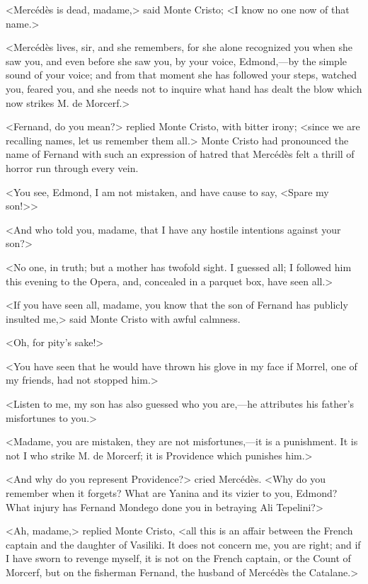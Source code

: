  <Mercédès is dead, madame,> said Monte Cristo; <I know no one now of that name.> 

 <Mercédès lives, sir, and she remembers, for she alone recognized you when she saw you, and even before she saw you, by your voice, Edmond,—by the simple sound of your voice; and from that moment she has followed your steps, watched you, feared you, and she needs not to inquire what hand has dealt the blow which now strikes M. de Morcerf.> 

 <Fernand, do you mean?> replied Monte Cristo, with bitter irony; <since we are recalling names, let us remember them all.> Monte Cristo had pronounced the name of Fernand with such an expression of hatred that Mercédès felt a thrill of horror run through every vein. 

 <You see, Edmond, I am not mistaken, and have cause to say, <Spare my son!>> 

 <And who told you, madame, that I have any hostile intentions against your son?> 

 <No one, in truth; but a mother has twofold sight. I guessed all; I followed him this evening to the Opera, and, concealed in a parquet box, have seen all.> 

 <If you have seen all, madame, you know that the son of Fernand has publicly insulted me,> said Monte Cristo with awful calmness. 

 <Oh, for pity's sake!> 

 <You have seen that he would have thrown his glove in my face if Morrel, one of my friends, had not stopped him.> 

 <Listen to me, my son has also guessed who you are,—he attributes his father's misfortunes to you.> 

 <Madame, you are mistaken, they are not misfortunes,—it is a punishment. It is not I who strike M. de Morcerf; it is Providence which punishes him.> 

 <And why do you represent Providence?> cried Mercédès. <Why do you remember when it forgets? What are Yanina and its vizier to you, Edmond? What injury has Fernand Mondego done you in betraying Ali Tepelini?> 

 <Ah, madame,> replied Monte Cristo, <all this is an affair between the French captain and the daughter of Vasiliki. It does not concern me, you are right; and if I have sworn to revenge myself, it is not on the French captain, or the Count of Morcerf, but on the fisherman Fernand, the husband of Mercédès the Catalane.> 

